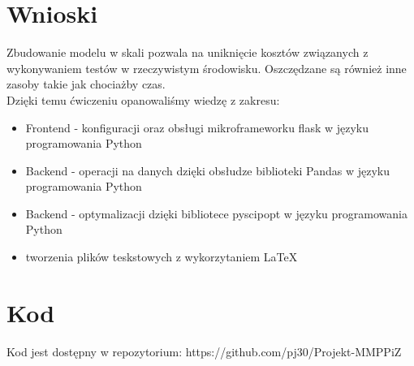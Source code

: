 \documentclass[11pt]{article}
\begin{document}
\section{Wnioski}
Zbudowanie modelu w skali pozwala na uniknięcie kosztów związanych z wykonywaniem testów w rzeczywistym środowisku. Oszczędzane są również inne zasoby takie jak chociażby czas.
\\Dzięki temu ćwiczeniu opanowaliśmy wiedzę z zakresu:
\begin{itemize}
	\item Frontend - konfiguracji oraz obsługi mikroframeworku flask w języku programowania Python
	\item Backend - operacji na danych dzięki obsłudze biblioteki Pandas w języku programowania Python
	\item Backend - optymalizacji dzięki bibliotece pyscipopt w języku programowania Python
	\item tworzenia plików teskstowych z wykorzytaniem LaTeX 
\end{itemize}

\section{Kod}
Kod jest dostępny w repozytorium: 
https://github.com/pj30/Projekt-MMPPiZ
\end{document}

